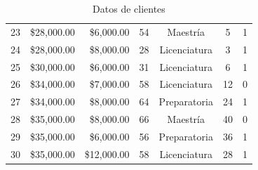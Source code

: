\documentclass{article}
\begin{document}
\begin{table}[h!]
\begin{tabular}{|c|r|r|c|c|c|c|}
        23 & \$28,000.00 & \$6,000.00 & 54 & Maestría    & 5  & 1 \\
        24 & \$28,000.00 & \$8,000.00 & 28 & Licenciatura & 3  & 1 \\
        25 & \$30,000.00 & \$6,000.00 & 31 & Licenciatura & 6  & 1 \\
        26 & \$34,000.00 & \$7,000.00 & 58 & Licenciatura & 12 & 0 \\
        27 & \$34,000.00 & \$8,000.00 & 64 & Preparatoria & 24 & 1 \\
        28 & \$35,000.00 & \$8,000.00 & 66 & Maestría    & 40 & 0 \\
        29 & \$35,000.00 & \$6,000.00 & 56 & Preparatoria & 36 & 1 \\
        30 & \$35,000.00 & \$12,000.00 & 58 & Licenciatura & 28 & 1 \\
        \hline
    \end{tabular}
    \caption{Datos de clientes}
    \label{tab:datos_clientes}
\end{table}

\clearpage
\end{document}
